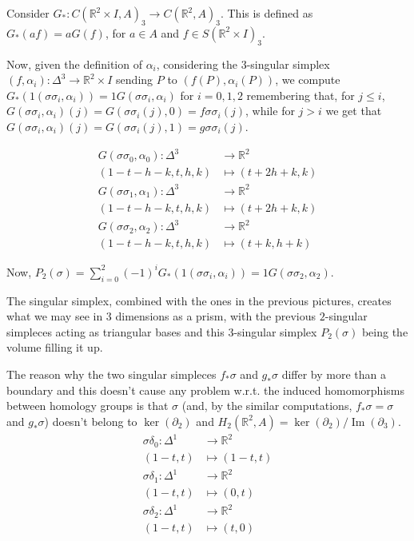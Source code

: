 \documentclass{article}
\newcommand{\numberset}{\mathbb}
\newcommand{\R}{\numberset{R}}
\DeclareMathOperator{\Ima}{Im}
\begin{document}
Consider $G_*:C(\R^2\times I,A)_3\rightarrow C(\R^2,A)_3$. This is defined as $G_*(af)=aG(f)$, for $a\in A$ and $f\in S(\R^2\times I)_3$.

Now, given the definition of $\alpha_i$, considering the 3-singular simplex $(f,\alpha_i):\Delta^3\rightarrow\R^2\times I$ sending $P$ to $(f(P),\alpha_i(P))$, we compute $G_*(1(\sigma\sigma_i,\alpha_i))=1G(\sigma\sigma_i,\alpha_i)$ for $i=0,1,2$ remembering that, for $j\leq i$, $G(\sigma\sigma_i,\alpha_i)(j)=G(\sigma\sigma_i(j),0)=f\sigma\sigma_i(j)$, while for $j>i$ we get that $G(\sigma\sigma_i,\alpha_i)(j)=G(\sigma\sigma_i(j),1)=g\sigma\sigma_i(j)$.

\begin{align*}
		G(\sigma\sigma_0,\alpha_0):\Delta^3 & \rightarrow\R^2 \\
		(1-t-h-k,t,h,k) & \mapsto (t+2h+k,k) \\
		G(\sigma\sigma_1,\alpha_1):\Delta^3 & \rightarrow\R^2 \\
		(1-t-h-k,t,h,k) & \mapsto (t+2h+k,k) \\
		G(\sigma\sigma_2,\alpha_2):\Delta^3 & \rightarrow\R^2 \\
		(1-t-h-k,t,h,k) & \mapsto (t+k,h+k)
\end{align*}

Now, $P_2(\sigma)=\sum_{i=0}^2 (-1)^iG_*(1(\sigma\sigma_i,\alpha_i))=1G(\sigma\sigma_2,\alpha_2)$.

The singular simplex, combined with the ones in the previous pictures, creates what we may see in 3 dimensions as a prism, with the previous $2$-singular simpleces acting as triangular bases and this $3$-singular simplex $P_2(\sigma)$ being the volume filling it up.

The reason why the two singular simpleces $f_*\sigma$ and $g_*\sigma$ differ by more than a boundary and this doesn't cause any problem w.r.t. the induced homomorphisms between homology groups is that $\sigma$ (and, by the similar computations, $f_*\sigma=\sigma$ and $g_*\sigma$) doesn't belong to $\ker(\partial_2)$ and $H_2(\R^2,A)=\ker(\partial_2)/\Ima(\partial_3)$.
\begin{align*}
		\sigma\delta_0:\Delta^1 & \rightarrow \R^2 \\
		(1-t,t) & \mapsto (1-t,t) \\
		\sigma\delta_1:\Delta^1 & \rightarrow \R^2 \\
		(1-t,t) & \mapsto (0,t) \\
		\sigma\delta_2:\Delta^1 & \rightarrow \R^2 \\
		(1-t,t) & \mapsto (t,0)
\end{align*}
\end{document}
